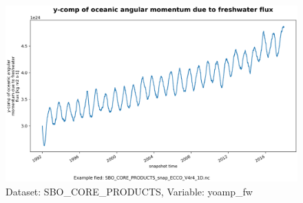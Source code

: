 \begin{figure}[H]
\centering
\includegraphics[scale=0.55]{../images/plots/oneD_plots/SBO_Core_Products/yoamp_fw.png}
\caption{Dataset: SBO\_CORE\_PRODUCTS, Variable: yoamp\_fw}
\label{tab:table-SBO_CORE_PRODUCTS_yoamp_fw-Plot}
\end{figure}
\pagebreak
